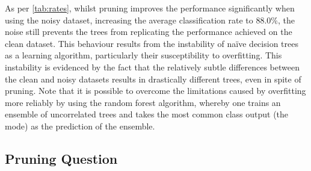 \documentclass[11pt,twoside]{article}
\begin{document}

As per \autoref{tab:rates}, whilst pruning improves the performance significantly when using the noisy dataset, increasing the average classification rate to 88.0\%, the noise still prevents the trees from replicating the performance achieved on the clean dataset. This behaviour results from the instability of na\"ive decision trees as a learning algorithm, particularly their susceptibility to overfitting. This instability is evidenced by the fact that the relatively subtle differences between the clean and noisy datasets results in drastically different trees, even in spite of pruning. Note that it is possible to overcome the limitations caused by overfitting more reliably by using the random forest algorithm, whereby one trains an ensemble of uncorrelated trees and takes the most common class output (the mode) as the prediction of the ensemble.
 

\subsection{Pruning Question}
\label{sec:pruning_question}
\end{document}
